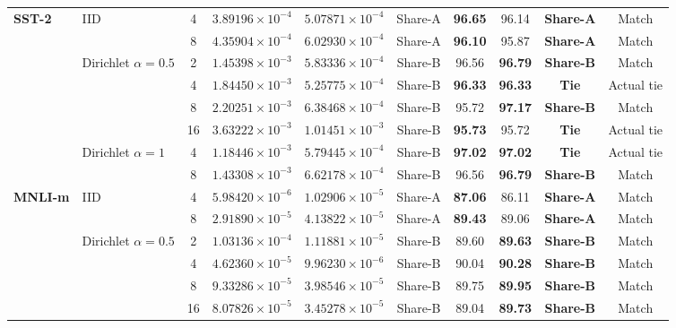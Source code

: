 \documentclass[lettersize,journal]{IEEEtran}
\begin{document}
\begin{table}[!t]
{\begin{tabular}{@{}llcccccccc@{}}
				\midrule
				\multirow{8}{*}{\textbf{SST-2}} & \multirow{2}{*}{IID} & 4 & $3.89196\!\times\!10^{-4}$ & $5.07871\!\times\!10^{-4}$ & Share-A & \textbf{96.65} & 96.14 & \textbf{Share-A} & Match \\
				&  & 8 & $4.35904\!\times\!10^{-4}$ & $6.02930\!\times\!10^{-4}$ & Share-A & \textbf{96.10} & 95.87 & \textbf{Share-A} & Match \\
				& \multirow{4}{*}{Dirichlet $\alpha=0.5$} & 2 & $1.45398\!\times\!10^{-3}$ & $5.83336\!\times\!10^{-4}$ & Share-B & 96.56 & \textbf{96.79} & \textbf{Share-B} & Match \\
				&  & 4 & $1.84450\!\times\!10^{-3}$ & $5.25775\!\times\!10^{-4}$ & Share-B & \textbf{96.33} & \textbf{96.33} & \textbf{Tie} & Actual tie \\
				&  & 8 & $2.20251\!\times\!10^{-3}$ & $6.38468\!\times\!10^{-4}$ & Share-B & 95.72 & \textbf{97.17} & \textbf{Share-B} & Match \\
				&  & 16 & $3.63222\!\times\!10^{-3}$ & $1.01451\!\times\!10^{-3}$ & Share-B & \textbf{95.73} & 95.72 & \textbf{Tie} & Actual tie \\
				& \multirow{2}{*}{Dirichlet $\alpha=1$} & 4 & $1.18446\!\times\!10^{-3}$ & $5.79445\!\times\!10^{-4}$ & Share-B & \textbf{97.02} & \textbf{97.02} & \textbf{Tie} & Actual tie \\
				&  & 8 & $1.43308\!\times\!10^{-3}$ & $6.62178\!\times\!10^{-4}$ & Share-B & 96.56 & \textbf{96.79} & \textbf{Share-B} & Match \\
				\midrule
				\multirow{8}{*}{\textbf{MNLI-m}} & \multirow{2}{*}{IID} & 4 & $5.98420\!\times\!10^{-6}$ & $1.02906\!\times\!10^{-5}$ & Share-A & \textbf{87.06} & 86.11 & \textbf{Share-A} & Match \\
				&  & 8 & $2.91890\!\times\!10^{-5}$ & $4.13822\!\times\!10^{-5}$ & Share-A & \textbf{89.43} & 89.06 & \textbf{Share-A} & Match \\
				& \multirow{4}{*}{Dirichlet $\alpha=0.5$} & 2 & $1.03136\!\times\!10^{-4}$ & $1.11881\!\times\!10^{-5}$ & Share-B & 89.60 & \textbf{89.63} & \textbf{Share-B} & Match \\
				&  & 4 & $4.62360\!\times\!10^{-5}$ & $9.96230\!\times\!10^{-6}$ & Share-B & 90.04 & \textbf{90.28} & \textbf{Share-B} & Match \\
				&  & 8 & $9.33286\!\times\!10^{-5}$ & $3.98546\!\times\!10^{-5}$ & Share-B & 89.75 & \textbf{89.95} & \textbf{Share-B} & Match \\
				&  & 16 & $8.07826\!\times\!10^{-5}$ & $3.45278\!\times\!10^{-5}$ & Share-B & 89.04 & \textbf{89.73} & \textbf{Share-B} & Match \\

\end{tabular}}
\end{table}
\end{document}
